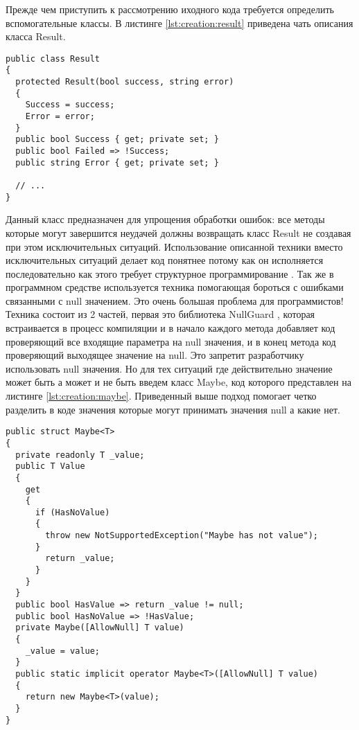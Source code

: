 Прежде чем приступить к рассмотрению иходного кода требуется определить вспомогательные классы. 
В листинге \ref{lst:creation:result} приведена чать описания класса Result.
\begin{lstlisting}[style=fsharpstyle, caption={Определение вспомогательного класса Result}, label=lst:creation:result]
public class Result
{
  protected Result(bool success, string error)
  {
    Success = success;
    Error = error;
  }
  public bool Success { get; private set; }
  public bool Failed => !Success;
  public string Error { get; private set; }
  
  // ... 
}
\end{lstlisting}
Данный класс предназначен для упрощения обработки ошибок: все методы которые могут завершится неудачей должны возвращать класс Result не создавая при этом исключительных ситуаций. Использование описанной техники вместо исключительных ситуаций делает код понятнее потому как он исполняется последовательно как этого требует структурное программирование \cite{structured_programming}. Так же в программном средстве используется техника помогающая бороться с ошибками связанными с null значением. Это очень большая проблема для программистов! Техника состоит из 2 частей, первая это библиотека NullGuard \cite{null_guard}, которая встраивается в процесс компиляции и в начало каждого метода добавляет код проверяющий все входящие параметра на null значения, и в конец метода код проверяющий выходящее значение на null. Это запретит разработчику использовать null значения. Но для тех ситуаций где действительно значение может быть а может и не быть введем класс Maybe, код которого представлен на листинге \ref{lst:creation:maybe}. Приведенный выше подход помогает четко разделить в коде значения которые могут принимать значения null а какие нет.
\begin{lstlisting}[style=fsharpstyle, caption={Определение вспомогательного класса Maybe}, label=lst:creation:maybe]
public struct Maybe<T>
{
  private readonly T _value;
  public T Value
  {
    get
    {
      if (HasNoValue)
      {
        throw new NotSupportedException("Maybe has not value");
      }
        return _value;
      }
    }
  }
  public bool HasValue => return _value != null; 
  public bool HasNoValue => !HasValue;
  private Maybe([AllowNull] T value)
  {
    _value = value;
  }
  public static implicit operator Maybe<T>([AllowNull] T value)
  {
    return new Maybe<T>(value);
  }
}
\end{lstlisting}


